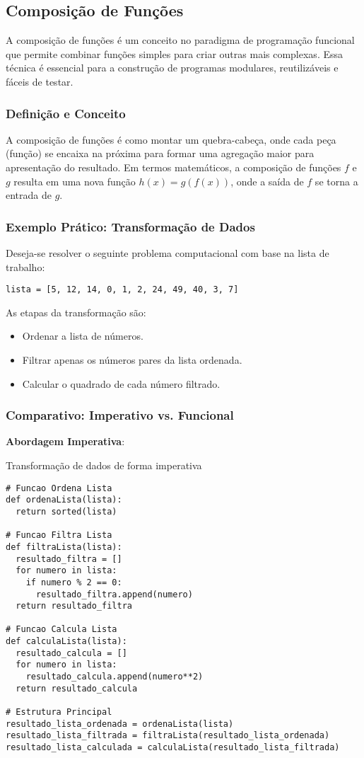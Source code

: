 \subsection{Composição de Funções}
A composição de funções é um conceito no paradigma de programação funcional que permite combinar funções simples para criar outras mais complexas. Essa técnica é essencial para a construção de programas modulares, reutilizáveis e fáceis de testar.

\subsubsection{Definição e Conceito}
A composição de funções é como montar um quebra-cabeça, onde cada peça (função) se encaixa na próxima para formar uma agregação maior para apresentação do resultado. Em termos matemáticos, a composição de funções $f$ e $g$ resulta em uma nova função $h(x) = g(f(x))$, onde a saída de $f$ se torna a entrada de $g$.

\subsubsection{Exemplo Prático: Transformação de Dados}
Deseja-se resolver o seguinte problema computacional com base na lista de trabalho:
\begin{verbatim}
lista = [5, 12, 14, 0, 1, 2, 24, 49, 40, 3, 7]
\end{verbatim}
As etapas da transformação são:
\begin{itemize}
    \item Ordenar a lista de números.
    \item Filtrar apenas os números pares da lista ordenada.
    \item Calcular o quadrado de cada número filtrado.
\end{itemize}

\subsubsection{Comparativo: Imperativo vs. Funcional}
\textbf{Abordagem Imperativa}:

\begin{codelisting}{Transformação de dados de forma imperativa}
    \label{listing:imperativa}
    \begin{verbatim}
# Funcao Ordena Lista
def ordenaLista(lista):
  return sorted(lista)

# Funcao Filtra Lista
def filtraLista(lista):
  resultado_filtra = []
  for numero in lista:
    if numero % 2 == 0:
      resultado_filtra.append(numero)
  return resultado_filtra

# Funcao Calcula Lista
def calculaLista(lista):
  resultado_calcula = []
  for numero in lista:
    resultado_calcula.append(numero**2)
  return resultado_calcula

# Estrutura Principal
resultado_lista_ordenada = ordenaLista(lista)
resultado_lista_filtrada = filtraLista(resultado_lista_ordenada)
resultado_lista_calculada = calculaLista(resultado_lista_filtrada)
    \end{verbatim}
\end{codelisting}

